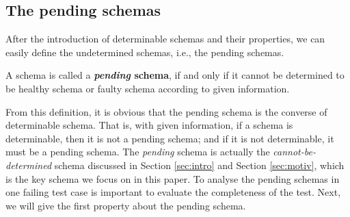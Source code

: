 \subsection{The pending schemas}\label{sec:pending:pending}

After the introduction of determinable schemas and their properties, we can easily define the undetermined schemas, i.e., the pending schemas.

\begin{definition}\label{de:pending}
A schema is called a \textbf{\emph{pending} schema}, if and only if it cannot be determined to be healthy schema or faulty schema according to given information.
\end{definition}


From this definition, it is obvious that the pending schema is the converse of determinable schema. That is, with given information, if a schema is determinable, then it is not a pending schema; and if it is not determinable, it must be a pending schema. The \emph{pending} schema is actually the \emph{cannot-be-determined} schema discussed in Section \ref{sec:intro} and Section \ref{sec:motiv}, which is the key schema we focus on in this paper. To analyse the pending schemas in one failing test case is important to evaluate the completeness of the test.  Next, we will give the first property about the pending schema.


%
%
%

